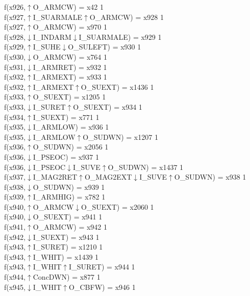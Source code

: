f(x926,$\uparrow$O\_ARMCW) = x42 {1} \\
f(x927,$\uparrow$I\_SUARMALE$\uparrow$O\_ARMCW) = x928 {1} \\
f(x927,$\uparrow$O\_ARMCW) = x970 {1} \\
f(x928,$\downarrow$I\_INDARM$\downarrow$I\_SUARMALE) = x929 {1} \\
f(x929,$\uparrow$I\_SUHE$\downarrow$O\_SULEFT) = x930 {1} \\
f(x930,$\downarrow$O\_ARMCW) = x764 {1} \\
f(x931,$\downarrow$I\_ARMRET) = x932 {1} \\
f(x932,$\uparrow$I\_ARMEXT) = x933 {1} \\
f(x932,$\uparrow$I\_ARMEXT$\uparrow$O\_SUEXT) = x1436 {1} \\
f(x933,$\uparrow$O\_SUEXT) = x1205 {1} \\
f(x933,$\downarrow$I\_SURET$\uparrow$O\_SUEXT) = x934 {1} \\
f(x934,$\uparrow$I\_SUEXT) = x771 {1} \\
f(x935,$\downarrow$I\_ARMLOW) = x936 {1} \\
f(x935,$\downarrow$I\_ARMLOW$\uparrow$O\_SUDWN) = x1207 {1} \\
f(x936,$\uparrow$O\_SUDWN) = x2056 {1} \\
f(x936,$\downarrow$I\_PSEOC) = x937 {1} \\
f(x936,$\downarrow$I\_PSEOC$\downarrow$I\_SUVE$\uparrow$O\_SUDWN) = x1437 {1} \\
f(x937,$\downarrow$I\_MAG2RET$\uparrow$O\_MAG2EXT$\downarrow$I\_SUVE$\uparrow$O\_SUDWN) = x938 {1} \\
f(x938,$\downarrow$O\_SUDWN) = x939 {1} \\
f(x939,$\uparrow$I\_ARMHIG) = x782 {1} \\
f(x940,$\uparrow$O\_ARMCW$\downarrow$O\_SUEXT) = x2060 {1} \\
f(x940,$\downarrow$O\_SUEXT) = x941 {1} \\
f(x941,$\uparrow$O\_ARMCW) = x942 {1} \\
f(x942,$\downarrow$I\_SUEXT) = x943 {1} \\
f(x943,$\uparrow$I\_SURET) = x1210 {1} \\
f(x943,$\uparrow$I\_WHIT) = x1439 {1} \\
f(x943,$\uparrow$I\_WHIT$\uparrow$I\_SURET) = x944 {1} \\
f(x944,$\uparrow$ConcDWN) = x877 {1} \\
f(x945,$\downarrow$I\_WHIT$\uparrow$O\_CBFW) = x946 {1} \\
